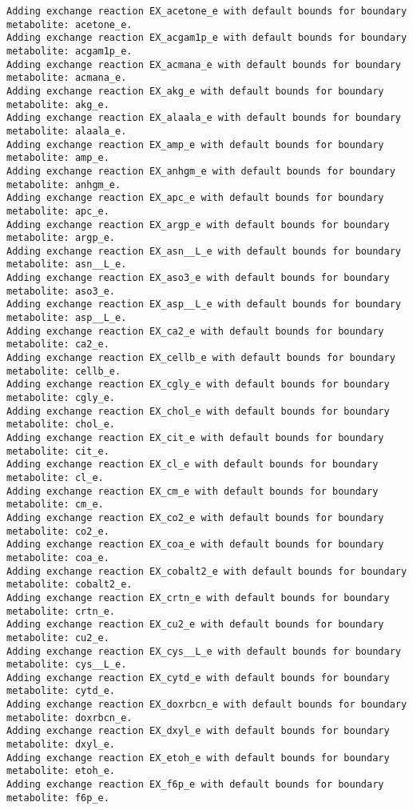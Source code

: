 \documentclass[
  letterpaper,
  DIV=11,
  numbers=noendperiod]{scrartcl}
\begin{document}
\begin{verbatim}
Adding exchange reaction EX_acetone_e with default bounds for boundary metabolite: acetone_e.
Adding exchange reaction EX_acgam1p_e with default bounds for boundary metabolite: acgam1p_e.
Adding exchange reaction EX_acmana_e with default bounds for boundary metabolite: acmana_e.
Adding exchange reaction EX_akg_e with default bounds for boundary metabolite: akg_e.
Adding exchange reaction EX_alaala_e with default bounds for boundary metabolite: alaala_e.
Adding exchange reaction EX_amp_e with default bounds for boundary metabolite: amp_e.
Adding exchange reaction EX_anhgm_e with default bounds for boundary metabolite: anhgm_e.
Adding exchange reaction EX_apc_e with default bounds for boundary metabolite: apc_e.
Adding exchange reaction EX_argp_e with default bounds for boundary metabolite: argp_e.
Adding exchange reaction EX_asn__L_e with default bounds for boundary metabolite: asn__L_e.
Adding exchange reaction EX_aso3_e with default bounds for boundary metabolite: aso3_e.
Adding exchange reaction EX_asp__L_e with default bounds for boundary metabolite: asp__L_e.
Adding exchange reaction EX_ca2_e with default bounds for boundary metabolite: ca2_e.
Adding exchange reaction EX_cellb_e with default bounds for boundary metabolite: cellb_e.
Adding exchange reaction EX_cgly_e with default bounds for boundary metabolite: cgly_e.
Adding exchange reaction EX_chol_e with default bounds for boundary metabolite: chol_e.
Adding exchange reaction EX_cit_e with default bounds for boundary metabolite: cit_e.
Adding exchange reaction EX_cl_e with default bounds for boundary metabolite: cl_e.
Adding exchange reaction EX_cm_e with default bounds for boundary metabolite: cm_e.
Adding exchange reaction EX_co2_e with default bounds for boundary metabolite: co2_e.
Adding exchange reaction EX_coa_e with default bounds for boundary metabolite: coa_e.
Adding exchange reaction EX_cobalt2_e with default bounds for boundary metabolite: cobalt2_e.
Adding exchange reaction EX_crtn_e with default bounds for boundary metabolite: crtn_e.
Adding exchange reaction EX_cu2_e with default bounds for boundary metabolite: cu2_e.
Adding exchange reaction EX_cys__L_e with default bounds for boundary metabolite: cys__L_e.
Adding exchange reaction EX_cytd_e with default bounds for boundary metabolite: cytd_e.
Adding exchange reaction EX_doxrbcn_e with default bounds for boundary metabolite: doxrbcn_e.
Adding exchange reaction EX_dxyl_e with default bounds for boundary metabolite: dxyl_e.
Adding exchange reaction EX_etoh_e with default bounds for boundary metabolite: etoh_e.
Adding exchange reaction EX_f6p_e with default bounds for boundary metabolite: f6p_e.

\end{verbatim}
\end{document}
